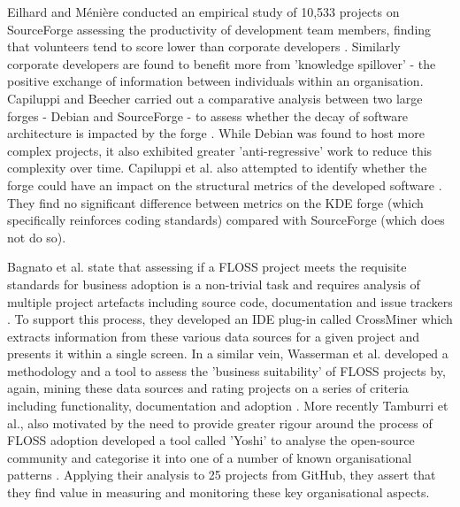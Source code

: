 Eilhard and M{\'e}ni{\`e}re conducted an empirical study of 10,533 projects on SourceForge assessing the productivity of development team members, finding that volunteers tend to score lower than corporate developers \citep{eilhard2009look}. Similarly corporate developers are found to benefit more from 'knowledge spillover' - the positive exchange of information between individuals within an organisation. Capiluppi and Beecher carried out a comparative analysis between two large forges - Debian and SourceForge - to assess whether the decay of software architecture is impacted by the forge \citep{capiluppi2009structural}. While Debian was found to host more complex projects, it also exhibited greater 'anti-regressive' work to reduce this complexity over time. Capiluppi et al. also attempted to identify whether the forge could have an impact on the structural metrics of the developed software \citep{capiluppi2009quality}. They find no significant difference between metrics on the KDE forge (which specifically reinforces coding standards) compared with SourceForge (which does not do so). 

Bagnato et al. state that assessing if a FLOSS project meets the requisite standards for business adoption is a non-trivial task and requires analysis of multiple project artefacts including source code, documentation and issue trackers \citep{bagnato2017developer}. To support this process, they developed an IDE plug-in called CrossMiner which extracts information from these various data sources for a given project and presents it within a single screen. In a similar vein, Wasserman et al. developed a methodology and a tool to assess the 'business suitability' of FLOSS projects by, again, mining these data sources and rating projects on a series of criteria including  functionality, documentation and adoption \citep{wasserman2017osspal}. More recently Tamburri et al., also motivated by the need to provide greater rigour around the process of FLOSS adoption developed a tool called 'Yoshi' to analyse the open-source community and categorise it into one of a number of known organisational patterns \citep{tamburri2018discovering}. Applying their analysis to 25 projects from GitHub, they assert that they find value in measuring and monitoring these key organisational aspects. 

